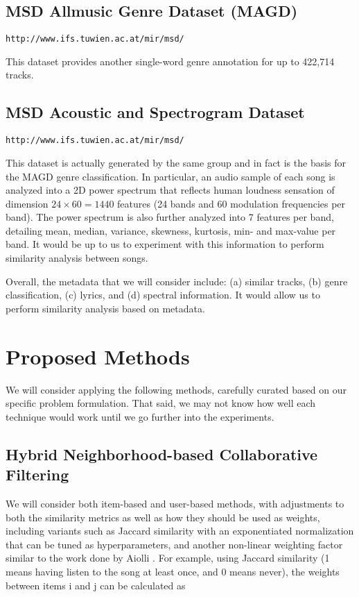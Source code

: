 \documentclass[conference]{IEEEtran}
\begin{document}
\subsection{MSD Allmusic Genre Dataset (MAGD)}

{\small \texttt{http://www.ifs.tuwien.ac.at/mir/msd/}}

This dataset provides another single-word genre annotation for up to 422,714 tracks.

\subsection{MSD Acoustic and Spectrogram Dataset}

{\small \texttt{http://www.ifs.tuwien.ac.at/mir/msd/}}

This dataset is actually generated by the same group and in fact is the basis for the MAGD genre classification. In particular, an audio sample of each song is analyzed into a 2D power spectrum that reflects human loudness sensation \cite{lidy2005evaluation} of dimension $24 \times 60 = 1440$ features (24 bands and 60 modulation frequencies per band). The power spectrum is also further analyzed into 7 features per band, detailing mean, median, variance, skewness, kurtosis, min- and max-value per band. It would be up to us to experiment with this information to perform similarity analysis between songs.

Overall, the metadata that we will consider include: (a) similar tracks, (b) genre classification, (c) lyrics, and (d) spectral information. It would allow us to perform similarity analysis based on metadata.

\section{Proposed Methods}

We will consider applying the following methods, carefully curated based on our specific problem formulation. That said, we may not know how well each technique would work until we go further into the experiments.

\subsection{Hybrid Neighborhood-based Collaborative Filtering}

We will consider both item-based and user-based methods, with adjustments to both the similarity metrics as well as how they should be used as weights, including variants such as Jaccard similarity with an exponentiated normalization that can be tuned as hyperparameters, and another non-linear weighting factor similar to the work done by Aiolli
\cite{aiolli2013efficient}. For example, using Jaccard similarity (1 means having listen to the song at least once, and 0 means never), the weights between items i and j can be calculated as
\end{document}
